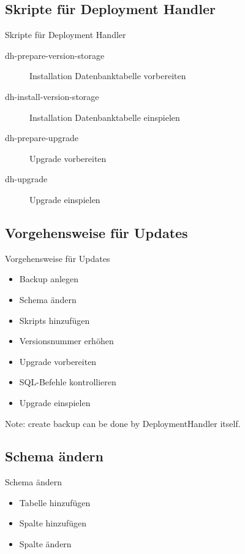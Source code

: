 \subsection{Skripte für Deployment Handler}
\begin{frame}{Skripte für Deployment Handler}
\begin{description}
\item[dh-prepare-version-storage] Installation Datenbanktabelle vorbereiten
\item[dh-install-version-storage] Installation Datenbanktabelle einspielen
\item[dh-prepare-upgrade] Upgrade vorbereiten
\item[dh-upgrade] Upgrade einspielen
\end{description}
\end{frame}

\subsection{Vorgehensweise für Updates}

\begin{frame}{Vorgehensweise für Updates}
\begin{itemize}
\item Backup anlegen
\item Schema ändern
\item Skripts hinzufügen
\item Versionsnummer erhöhen
\item Upgrade vorbereiten
\item SQL-Befehle kontrollieren
\item Upgrade einspielen
\end{itemize}
\end{frame}

Note: create backup can be done by DeploymentHandler itself.

\subsection{Schema ändern}

\begin{frame}{Schema ändern}
\begin{itemize}
\item Tabelle hinzufügen
\item Spalte hinzufügen
\item Spalte ändern
\end{itemize}
\end{frame}

